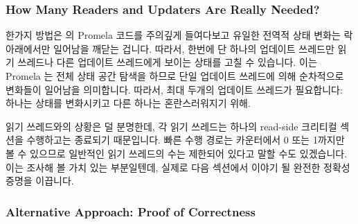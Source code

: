 \iffalse

The following sections discuss each of these approaches.

\fi

\subsubsection{How Many Readers and Updaters Are Really Needed?}
\label{sec:formal:How Many Readers and Updaters Are Really Needed?}

한가지 방법은  의 Promela 코드를 주의깊게 들여다보고 유일한
전역적 상태 변화는 락 아래에서만 일어남을 깨닫는 겁니다.
따라서, 한번에 단 하나의 업데이트 쓰레드만 읽기 쓰레드나 다른 업데이트
쓰레드에게 보이는 상태를 고칠 수 있습니다.
이는 Promela 는 전체 상태 공간 탐색을 하므로 단일 업데이트 쓰레드에 의해
순차적으로 변화들이 일어남을 의미합니다.
따라서, 최대 두개의 업데이트 쓰레드가 필요합니다: 하나는 상태를 변화시키고 다른
하나는 혼란스러워지기 위해.

읽기 쓰레드와의 상황은 덜 분명한데, 각 읽기 쓰레드는 하나의 read-side 크리티컬
섹션을 수행하고는 종료되기 때문입니다.
빠른 수행 경로는 카운터에서 0 또는 1까지만 볼 수 있으므로 일반적인 읽기
쓰레드의 수는 제한되어 있다고 말할 수도 있겠습니다.
이는 조사해 볼 가치 있는 부분일텐데, 실제로 다음 섹션에서 이야기 될 완전한
정확성 증명을 이끕니다.

\iffalse

One approach is to look carefully at the Promela code for
\co{qrcu_updater()} and notice that the only global state
change is happening under the lock.
Therefore, only one updater at a time can possibly be modifying
state visible to either readers or other updaters.
This means that any sequences of state changes can be carried
out serially by a single updater due to the fact that Promela does a full
state-space search.
Therefore, at most two updaters are required: one to change state
and a second to become confused.

The situation with the readers is less clear-cut, as each reader
does only a single read-side critical section then terminates.
It is possible to argue that the useful number of readers is limited,
due to the fact that the fastpath must see at most a zero and a one
in the counters.
This is a fruitful avenue of investigation, in fact, it leads to
the full proof of correctness described in the next section.

\fi

\subsubsection{Alternative Approach: Proof of Correctness}
\label{sec:formal:Alternative Approach: Proof of Correctness}

